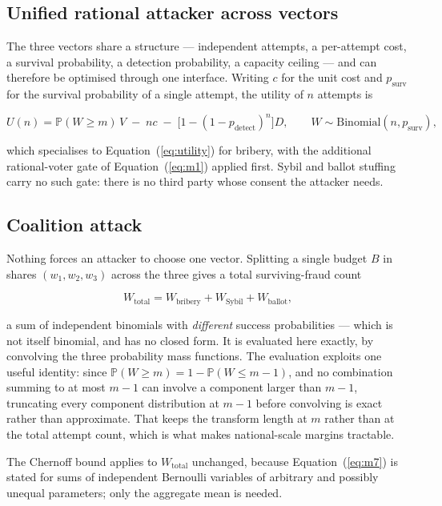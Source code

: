 \documentclass[11pt,a4paper]{article}
\newcommand{\Prob}{\mathbb{P}}
\newcommand{\Bin}{\mathrm{Binomial}}
\newcommand{\eqnref}[1]{Equation~(\ref{#1})}
\begin{document}
\subsection{Unified rational attacker across vectors}
\label{sec:unified}

The three vectors share a structure --- independent attempts, a per-attempt cost, a
survival probability, a detection probability, a capacity ceiling --- and can therefore
be optimised through one interface. Writing $c$ for the unit cost and $p_{\text{surv}}$
for the survival probability of a single attempt, the utility of $n$ attempts is

\begin{equation}
U(n) = \Prob(W \geq m)\, V \;-\; n c \;-\; \big[1 - (1-p_{\text{detect}})^{n}\big] D,
\qquad W \sim \Bin(n, p_{\text{surv}}),
\label{eq:g1}
\end{equation}

which specialises to \eqnref{eq:utility} for bribery, with the additional rational-voter
gate of \eqnref{eq:m1} applied first. Sybil and ballot stuffing carry no such gate:
there is no third party whose consent the attacker needs.

\subsection{Coalition attack}
\label{sec:coalition-model}

Nothing forces an attacker to choose one vector. Splitting a single budget $B$ in shares
$(w_1, w_2, w_3)$ across the three gives a total surviving-fraud count

\begin{equation}
W_{\text{total}} = W_{\text{bribery}} + W_{\text{Sybil}} + W_{\text{ballot}},
\label{eq:g2}
\end{equation}

a sum of independent binomials with \emph{different} success probabilities --- which is
not itself binomial, and has no closed form. It is evaluated here exactly, by convolving
the three probability mass functions. The evaluation exploits one useful identity:
since $\Prob(W \geq m) = 1 - \Prob(W \leq m-1)$, and no combination summing to at most
$m-1$ can involve a component larger than $m-1$, truncating every component distribution
at $m-1$ before convolving is exact rather than approximate. That keeps the transform
length at $m$ rather than at the total attempt count, which is what makes national-scale
margins tractable.

The Chernoff bound applies to $W_{\text{total}}$ unchanged, because \eqnref{eq:m7} is
stated for sums of independent Bernoulli variables of arbitrary and possibly unequal
parameters; only the aggregate mean is needed.
\end{document}
